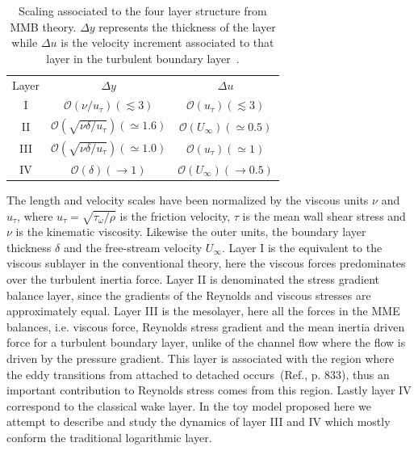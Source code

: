 \documentclass[aps,reprint,amsmath,amssymb,pra]{revtex4-1}%
\begin{document}
\begin{table}[htb]%
\caption{\label{tab:4layerstructure}%
Scaling associated to the four layer structure from MMB theory. $\Delta y$ represents the thickness of the layer while $\Delta u$ is the velocity increment associated to that layer in the turbulent boundary layer~\citep{Klewickimmb}.
}
\begin{ruledtabular}
\begin{tabular}{ccc}
\textrm{Layer}&
\textrm{$\Delta y$}&
\textrm{$\Delta u$}\\
\colrule
I &$\mathcal{O}(\nu/u_{\tau})(\lesssim 3)$&$\mathcal{O}(u_{\tau})(\lesssim 3)$\\
II &$\mathcal{O}(\sqrt{\nu\delta/u_{\tau}})(\simeq 1.6)$&$\mathcal{O}(U_{\infty})(\simeq 0.5)$\\
III &$\mathcal{O}(\sqrt{\nu\delta/u_{\tau}})(\simeq 1.0)$&$\mathcal{O}(u_{\tau})(\simeq 1)$\\
IV &$\mathcal{O}(\delta)(\rightarrow 1)$&$\mathcal{O}(U_{\infty})(\rightarrow 0.5)$ \\
\end{tabular}
\end{ruledtabular}
\end{table}
The length and velocity scales have been normalized by the viscous units $\nu$ and $u_{\tau}$, where $u_{\tau}=\sqrt{\tau_{\omega}/\rho}$ is the friction velocity, $\tau$ is the mean wall shear stress and $\nu$ is the kinematic viscosity. Likewise the outer units, the boundary layer thickness $\delta$ and the free-stream velocity $U_{\infty}$. 
Layer I is the equivalent to the viscous sublayer in the conventional theory, here the viscous forces predominates over the turbulent inertia force. Layer II is denominated the stress gradient balance layer, since  the gradients of the Reynolds and viscous stresses are approximately equal. Layer III is the mesolayer, here all the forces in the MME balances, i.e. viscous force, Reynolds stress gradient and the mean inertia driven force for a turbulent boundary layer, unlike of the channel flow where the flow is driven by the pressure gradient. This layer is associated with the region where the eddy transitions from attached to detached occurs~(Ref.\citep{Klewickimmb}, p. 833), thus an important contribution to Reynolds stress comes from this region. Lastly layer IV correspond to the classical wake layer. In the toy model proposed here we attempt to describe and study the dynamics of layer III and IV which mostly conform the traditional logarithmic layer.
\end{document}
